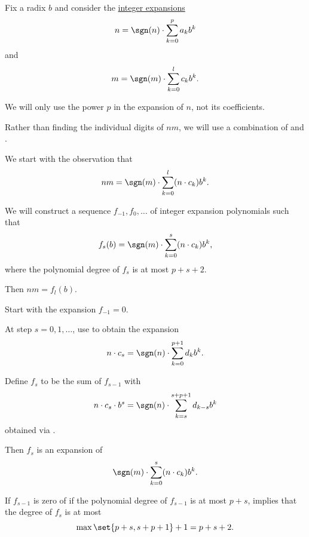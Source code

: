 \begin{algorithm}\label{alg:multi_digit_mult_with_carrying}
  Fix a radix \( b \) and consider the \hyperref[def:integer_radix_expansion]{integer expansions}
  \begin{equation*}
    n = \sgn(n) \cdot \sum_{k=0}^p a_k b^k
  \end{equation*}
  and
  \begin{equation*}
    m = \sgn(m) \cdot \sum_{k=0}^l c_k b^k.
  \end{equation*}

  We will only use the power \( p \) in the expansion of \( n \), not its coefficients.

  Rather than finding the individual digits of \( nm \), we will use a combination of  and .

  We start with the observation that
  \begin{equation*}
    nm = \sgn(m) \cdot \sum_{k=0}^l (n \cdot c_k) b^k.
  \end{equation*}

  We will construct a sequence \( f_{-1}, f_0, \ldots \) of integer expansion polynomials such that
  \begin{equation*}
    f_s(b) = \sgn(m) \cdot \sum_{k=0}^s (n \cdot c_k) b^k,
  \end{equation*}
  where the polynomial degree of \( f_s \) is at most \( p + s + 2 \).

  Then \( nm = f_l(b) \).

  \begin{thmenum}
     Start with the expansion \( f_{-1} = 0 \).

     At step \( s = 0, 1, \ldots \), use  to obtain the expansion
    \begin{equation*}
      n \cdot c_s = \sgn(n) \cdot \sum_{k=0}^{p + 1} d_k b^k.
    \end{equation*}

    Define \( f_s \) to be the sum of \( f_{s-1} \) with
    \begin{equation*}
      n \cdot c_s \cdot b^s = \sgn(n) \cdot \sum_{k=s}^{s + p + 1} d_{k - s} b^k
    \end{equation*}
    obtained via .

    Then \( f_s \) is an expansion of
    \begin{equation*}
      \sgn(m) \cdot \sum_{k=0}^s (n \cdot c_k) b^k.
    \end{equation*}

    If \( f_{s-1} \) is zero of if the polynomial degree of \( f_{s-1} \) is at most \( p + s \),  implies that the degree of \( f_s \) is at most
    \begin{equation*}
      \max\set{ p + s, s + p + 1 } + 1 = p + s + 2.
    \end{equation*}
  \end{thmenum}
\end{algorithm}
